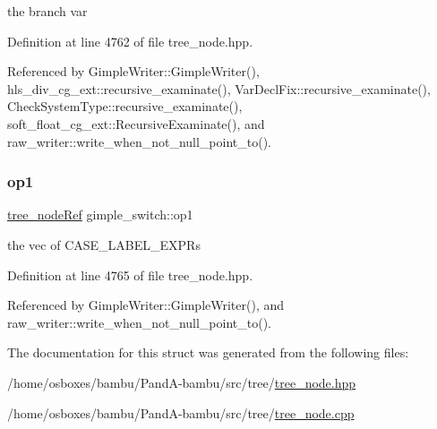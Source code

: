 the branch var 



Definition at line 4762 of file tree\+\_\+node.\+hpp.



Referenced by Gimple\+Writer\+::\+Gimple\+Writer(), hls\+\_\+div\+\_\+cg\+\_\+ext\+::recursive\+\_\+examinate(), Var\+Decl\+Fix\+::recursive\+\_\+examinate(), Check\+System\+Type\+::recursive\+\_\+examinate(), soft\+\_\+float\+\_\+cg\+\_\+ext\+::\+Recursive\+Examinate(), and raw\+\_\+writer\+::write\+\_\+when\+\_\+not\+\_\+null\+\_\+point\+\_\+to().

\mbox{\label{structgimple__switch_a92df1337f0d2f9ea9210dc688b37605f}} 
\subsubsection{\texorpdfstring{op1}{op1}}
{\footnotesize\ttfamily \hyperlink{tree__node_8hpp_a6ee377554d1c4871ad66a337eaa67fd5}{tree\+\_\+node\+Ref} gimple\+\_\+switch\+::op1}



the vec of C\+A\+S\+E\+\_\+\+L\+A\+B\+E\+L\+\_\+\+E\+X\+P\+Rs 



Definition at line 4765 of file tree\+\_\+node.\+hpp.



Referenced by Gimple\+Writer\+::\+Gimple\+Writer(), and raw\+\_\+writer\+::write\+\_\+when\+\_\+not\+\_\+null\+\_\+point\+\_\+to().



The documentation for this struct was generated from the following files\+:\begin{DoxyCompactItemize}
\item 
/home/osboxes/bambu/\+Pand\+A-\/bambu/src/tree/\hyperlink{tree__node_8hpp}{tree\+\_\+node.\+hpp}\item 
/home/osboxes/bambu/\+Pand\+A-\/bambu/src/tree/\hyperlink{tree__node_8cpp}{tree\+\_\+node.\+cpp}\end{DoxyCompactItemize}

